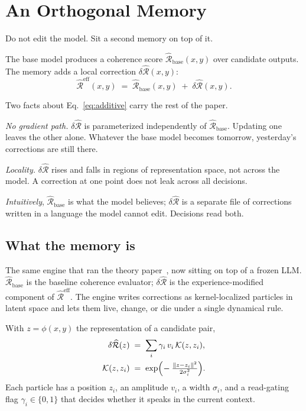 \documentclass[11pt,twocolumn]{article}
\newcommand{\Cohbase}{\widehat{\mathcal{R}}_{\mathrm{base}}}
\newcommand{\Coheff}{\widehat{\mathcal{R}}^{\mathrm{eff}}}
\newcommand{\dCoh}{\delta\widehat{\mathcal{R}}}
\newcommand{\Kern}{\mathcal{K}}
\theoremstyle{plain}
\begin{document}
\section{An Orthogonal Memory}
\label{sec:mechanism}

Do not edit the model. Sit a second memory on top of it.

The base model produces a coherence score $\Cohbase(x, y)$ over candidate outputs. The memory adds a local correction $\dCoh(x, y)$:
\begin{equation}
\label{eq:additive}
\Coheff(x, y) \;=\; \Cohbase(x, y) \;+\; \dCoh(x, y).
\end{equation}

Two facts about Eq.~\eqref{eq:additive} carry the rest of the paper.

\emph{No gradient path.} $\dCoh$ is parameterized independently of $\Cohbase$. Updating one leaves the other alone. Whatever the base model becomes tomorrow, yesterday's corrections are still there.

\emph{Locality.} $\dCoh$ rises and falls in regions of representation space, not across the model. A correction at one point does not leak across all decisions.

\emph{Intuitively}, $\Cohbase$ is what the model believes; $\dCoh$ is a separate file of corrections written in a language the model cannot edit. Decisions read both.

\subsection{What the memory is}

The same engine that ran the theory paper~\cite{negulescu2026ibf}, now sitting on top of a frozen LLM. $\Cohbase$ is the baseline coherence evaluator; $\dCoh$ is the experience-modified component of $\Coheff$. The engine writes corrections as kernel-localized particles in latent space and lets them live, change, or die under a single dynamical rule.

With $z = \phi(x, y)$ the representation of a candidate pair,
\begin{align}
\label{eq:dr}
\dCoh(z) &\;=\; \sum_i \gamma_i \, v_i \, \Kern(z, z_i), \\
\Kern(z, z_i) &\;=\; \exp\!\Big(\!-\tfrac{\lVert z - z_i \rVert^2}{2\sigma_i^2}\Big). \notag
\end{align}
Each particle has a position $z_i$, an amplitude $v_i$, a width $\sigma_i$, and a read-gating flag $\gamma_i \in \{0,1\}$ that decides whether it speaks in the current context.
\end{document}
